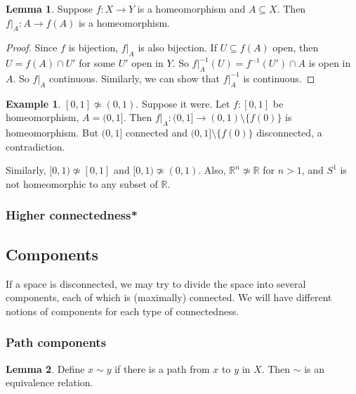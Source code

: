 \documentclass[a4paper,11pt]{article}
\theoremstyle{definition}
\newtheorem*{ex}{Example}
\newtheorem*{lem}{Lemma}
\numberwithin{equation}{section}
\begin{document}
\begin{lem}
    Suppose $f:X\rightarrow Y$ is a homeomorphism and $A\subseteq X$. Then $f|_A:A\rightarrow f(A)$ is a homeomorphism.
\end{lem}

\begin{proof}
Since $f$ is bijection, $f|_A$ is also bijection. If $U\subseteq f(A)$ open, then $U=f(A)\cap U'$ for some $U'$ open in $Y$. So $f|_A^{-1}(U)=f^{-1}(U')\cap A$ is open in $A$. So $f|_A$ continuous. Similarly, we can show that $f|_A^{-1}$ is continuous.
\end{proof}

\begin{ex}
$[0,1]\not\simeq(0,1)$. Suppose it were. Let $f:[0,1]$ be homeomorphism, $A=(0,1]$. Then $f|_A:(0,1]\rightarrow(0,1)\setminus\{f(0)\}$ is homeomorphism. But $(0,1]$ connected and $(0,1]\setminus\{f(0)\}$ disconnected, a contradiction.

Similarly, $[0,1)\not\simeq [0,1]$ and $[0,1)\not\simeq(0,1)$. Also, $\mathbb{R}^n\not\simeq \mathbb{R}$ for $n>1$, and $S^1$ is not homeomorphic to any subset of $\mathbb{R}$.
\end{ex}

\subsubsection{Higher connectedness*}

\subsection{Components}
If a space is disconnected, we may try to divide the space into several components, each of which is (maximally) connected. We will have different notions of components for each type of connectedness.

\subsubsection{Path components}
\begin{lem}
    Define $x\sim y$ if there is a path from $x$ to $y$ in $X$. Then $\sim$ is an equivalence relation.
\end{lem}
\end{document}
